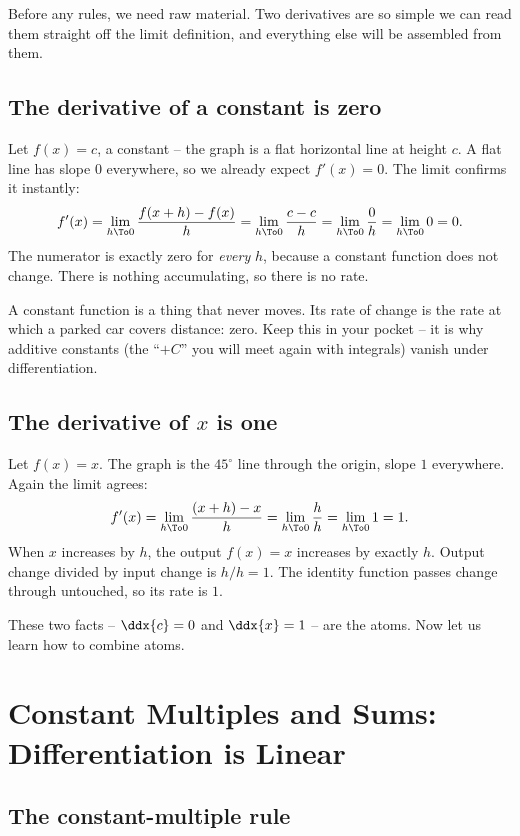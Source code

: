 Before any rules, we need raw material. Two derivatives are so simple we can read them
straight off the limit definition, and everything else will be assembled from them.

\subsection{The derivative of a constant is zero}

Let $f(x) = c$, a constant -- the graph is a flat horizontal line at height $c$. A flat
line has slope $0$ everywhere, so we already expect $f'(x)=0$. The limit confirms it
instantly:
\[
  f'(x) = \lim_{h\To 0}\frac{f(x+h)-f(x)}{h}
        = \lim_{h\To 0}\frac{c - c}{h}
        = \lim_{h\To 0}\frac{0}{h}
        = \lim_{h\To 0} 0 = 0.
\]
The numerator is exactly zero for \emph{every} $h$, because a constant function does not
change. There is nothing accumulating, so there is no rate.

\begin{intuitionbox}
A constant function is a thing that never moves. Its rate of change is the rate at which
a parked car covers distance: zero. Keep this in your pocket -- it is why additive
constants (the ``$+C$'' you will meet again with integrals) vanish under
differentiation.
\end{intuitionbox}

\subsection{The derivative of $x$ is one}

Let $f(x)=x$. The graph is the $45^\circ$ line through the origin, slope $1$ everywhere.
Again the limit agrees:
\[
  f'(x) = \lim_{h\To 0}\frac{(x+h)-x}{h}
        = \lim_{h\To 0}\frac{h}{h}
        = \lim_{h\To 0} 1 = 1.
\]
When $x$ increases by $h$, the output $f(x)=x$ increases by exactly $h$. Output change
divided by input change is $h/h = 1$. The identity function passes change through
untouched, so its rate is $1$.

These two facts -- $\ddx{c}=0$ and $\ddx{x}=1$ -- are the atoms. Now let us learn how to
combine atoms.

\section{Constant Multiples and Sums: Differentiation is Linear}
\label{ch11:linearity}

\subsection{The constant-multiple rule}

